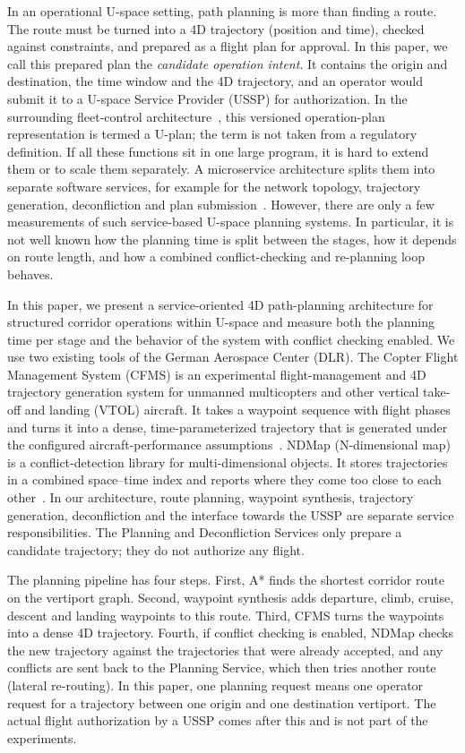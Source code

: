 In an operational U-space setting, path planning is more than finding a route. The route must be turned into a 4D trajectory (position and time), checked against constraints, and prepared as a flight plan for approval. In this paper, we call this prepared plan the \emph{candidate operation intent}. It contains the origin and destination, the time window and the 4D trajectory, and an operator would submit it to a U-space Service Provider (USSP) for authorization. In the surrounding fleet-control architecture~\cite{nagel2026microservice}, this versioned operation-plan representation is termed a U-plan; the term is not taken from a regulatory definition. If all these functions sit in one large program, it is hard to extend them or to scale them separately. A microservice architecture splits them into separate software services, for example for the network topology, trajectory generation, deconfliction and plan submission~\cite{dragoni2017microservices,matlekovic2020uav}. However, there are only a few measurements of such service-based U-space planning systems. In particular, it is not well known how the planning time is split between the stages, how it depends on route length, and how a combined conflict-checking and re-planning loop behaves.

In this paper, we present a service-oriented 4D path-planning architecture for structured corridor operations within U-space and measure both the planning time per stage and the behavior of the system with conflict checking enabled. We use two existing tools of the German Aerospace Center (DLR). The Copter Flight Management System (CFMS) is an experimental flight-management and 4D trajectory generation system for unmanned multicopters and other vertical take-off and landing (VTOL) aircraft. It takes a waypoint sequence with flight phases and turns it into a dense, time-parameterized trajectory that is generated under the configured aircraft-performance assumptions~\cite{morscheck2021cfms}. NDMap (N-dimensional map) is a conflict-detection library for multi-dimensional objects. It stores trajectories in a combined space--time index and reports where they come too close to each other~\cite{NDMap}. In our architecture, route planning, waypoint synthesis, trajectory generation, deconfliction and the interface towards the USSP are separate service responsibilities. The Planning and Deconfliction Services only prepare a candidate trajectory; they do not authorize any flight.

The planning pipeline has four steps. First, A* finds the shortest corridor route on the vertiport graph. Second, waypoint synthesis adds departure, climb, cruise, descent and landing waypoints to this route. Third, CFMS turns the waypoints into a dense 4D trajectory. Fourth, if conflict checking is enabled, NDMap checks the new trajectory against the trajectories that were already accepted, and any conflicts are sent back to the Planning Service, which then tries another route (lateral re-routing). In this paper, one planning request means one operator request for a trajectory between one origin and one destination vertiport. The actual flight authorization by a USSP comes after this and is not part of the experiments.


